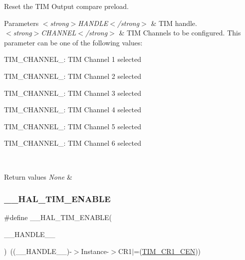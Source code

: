 Reset the T\+IM Output compare preload. 


\begin{DoxyParams}{Parameters}
{\em $<$strong$>$\+H\+A\+N\+D\+L\+E$<$/strong$>$} & T\+IM handle. \\
\hline
{\em $<$strong$>$\+C\+H\+A\+N\+N\+E\+L$<$/strong$>$} & T\+IM Channels to be configured. This parameter can be one of the following values\+: \begin{DoxyItemize}
\item T\+I\+M\+\_\+\+C\+H\+A\+N\+N\+E\+L\+\_\+: T\+IM Channel 1 selected \item T\+I\+M\+\_\+\+C\+H\+A\+N\+N\+E\+L\+\_\+: T\+IM Channel 2 selected \item T\+I\+M\+\_\+\+C\+H\+A\+N\+N\+E\+L\+\_\+: T\+IM Channel 3 selected \item T\+I\+M\+\_\+\+C\+H\+A\+N\+N\+E\+L\+\_\+: T\+IM Channel 4 selected \item T\+I\+M\+\_\+\+C\+H\+A\+N\+N\+E\+L\+\_\+: T\+IM Channel 5 selected \item T\+I\+M\+\_\+\+C\+H\+A\+N\+N\+E\+L\+\_\+: T\+IM Channel 6 selected \end{DoxyItemize}
\\
\hline
\end{DoxyParams}

\begin{DoxyRetVals}{Return values}
{\em None} & \\
\hline
\end{DoxyRetVals}
\mbox{\label{group___t_i_m___exported___macros_ga1a90544705059e9f19f991651623b0c0}} 
\subsubsection{\texorpdfstring{\_\_HAL\_TIM\_ENABLE}{\_\_HAL\_TIM\_ENABLE}}
{\footnotesize\ttfamily \#define \+\_\+\+\_\+\+H\+A\+L\+\_\+\+T\+I\+M\+\_\+\+E\+N\+A\+B\+LE(\begin{DoxyParamCaption}\item[{}]{\+\_\+\+\_\+\+H\+A\+N\+D\+L\+E\+\_\+\+\_\+ }\end{DoxyParamCaption})~((\+\_\+\+\_\+\+H\+A\+N\+D\+L\+E\+\_\+\+\_\+)-\/$>$Instance-\/$>$C\+R1$\vert$=(\mbox{\hyperlink{group___peripheral___registers___bits___definition_ga93d86355e5e3b399ed45e1ca83abed2a}{T\+I\+M\+\_\+\+C\+R1\+\_\+\+C\+EN}}))}



